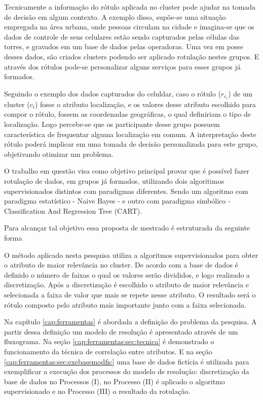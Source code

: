Tecnicamente a informação do rótulo aplicada no cluster pode ajudar na tomada de decisão em algum contexto. A exemplo disso, supõe-se uma situação empregada na área urbana, onde pessoas circulam na cidade e imagina-se que os dados de controle de seus celulares estão sendo capturados pelas células das torres, e gravados em um base de dados pelas operadoras. Uma vez em posse desses dados, são criados clusters podendo ser aplicado rotulação nestes grupos. E através dos rótulos pode-se personalizar alguns serviços para esses grupos já formados. 

Seguindo o exemplo dos dados capturados do celuldar, caso o rótulo (${r_{c_i}}$) de um cluster (${c_i}$) fosse o  atributo localização, e os valores  desse atributo escolhido para compor o rótulo, fossem as coordenadas geográficas, o qual definiriam o tipo de localização. Logo percebe-se que os participante desse grupo possuem característica de frequentar alguma localização em comum. A interpretação deste rótulo poderá implicar em uma tomada de decisão personalizada para este grupo, objetivando otimizar um problema.

O trabalho em questão visa como objetivo principal provar que é possível fazer rotulação de dados, em grupos já formados, utilizando dois algoritimos supervisionados distintos com paradigmas diferentes. Sendo um algoritmo com paradigma estatístico - Naive Bayes -  e outro com paradigma simbólico - Classification And Regression Tree (CART).
 

Para alcançar tal objetivo essa proposta de mestrado é estruturada da seguinte forma 



O método aplicado nesta pesquisa utiliza a algoritmos supervisionados  para obter o atributo de maior relevância no cluster. De acordo com a base de dados é definido o número de faixas o qual os valores serão divididos, e logo realizado a discretização. Após a discretização é escolhido o atributo de maior relevância e selecionada a faixa de valor que mais se repete nesse atributo. O resultado será o rótulo composto pelo atributo mais importante junto com a faixa selecionada.   

Na capítulo \ref{cap:ferramentas} é abordada a definição do problema da pesquisa. A partir dessa definição um modelo de resolução é apresentado através de um fluxograma. Na seção \ref{cap:ferramentas:sec:tecnica} é demonstrado o funcionamento da técnica de correlação entre atributos. E na seção \ref{cap:ferramentas:sec:exebasemodfic} uma base de dados fictícia é utilizada para exemplificar a execução dos processos do modelo de resolução: discretização da base de dados no Processos (I), no Processo (II) é aplicado o algoritmo supervisionado e no Processo (III) o resultado da rotulação. 

